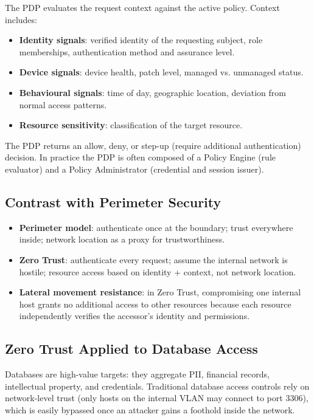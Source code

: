 The PDP evaluates the request context against the active policy. Context includes:
\begin{itemize}
    \item \textbf{Identity signals}: verified identity of the requesting subject, role memberships, authentication method and assurance level.
    \item \textbf{Device signals}: device health, patch level, managed vs. unmanaged status.
    \item \textbf{Behavioural signals}: time of day, geographic location, deviation from normal access patterns.
    \item \textbf{Resource sensitivity}: classification of the target resource.
\end{itemize}

The PDP returns an allow, deny, or step-up (require additional authentication) decision. In practice the PDP is often composed of a Policy Engine (rule evaluator) and a Policy Administrator (credential and session issuer).

\subsection{Contrast with Perimeter Security}

\begin{itemize}
    \item \textbf{Perimeter model}: authenticate once at the boundary; trust everywhere inside; network location as a proxy for trustworthiness.
    \item \textbf{Zero Trust}: authenticate every request; assume the internal network is hostile; resource access based on identity + context, not network location.
    \item \textbf{Lateral movement resistance}: in Zero Trust, compromising one internal host grants no additional access to other resources because each resource independently verifies the accessor's identity and permissions.
\end{itemize}

\subsection{Zero Trust Applied to Database Access}

Databases are high-value targets: they aggregate PII, financial records, intellectual property, and credentials. Traditional database access controls rely on network-level trust (only hosts on the internal VLAN may connect to port 3306), which is easily bypassed once an attacker gains a foothold inside the network.

